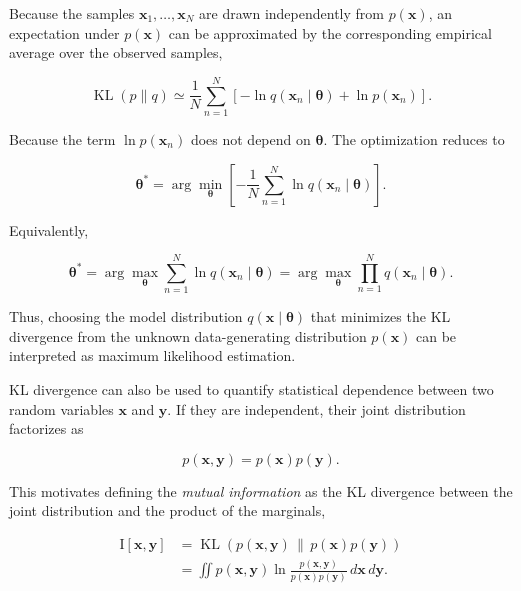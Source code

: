 \documentclass[10pt,twocolumn]{memoir}
\begin{document}
Because the samples $\mathbf{x}_1,\ldots,\mathbf{x}_N$ are drawn independently from $p(\mathbf{x})$, an expectation under $p(\mathbf{x})$ can be approximated by the corresponding empirical average over the observed samples,

\begin{equation}
    \operatorname{KL}(p\|q) \simeq \frac{1}{N}\sum_{n=1}^{N}\left[-\ln q(\mathbf{x}_n\mid\boldsymbol{\theta}) + \ln p(\mathbf{x}_n)\right].
\end{equation}

Because the term $\ln p(\mathbf{x}_n)$ does not depend on $\boldsymbol{\theta}$. The optimization reduces to

\begin{equation}
    \boldsymbol{\theta}^{*} = \arg\min_{\boldsymbol{\theta}}\left[-\frac{1}{N}\sum_{n=1}^{N}\ln q(\mathbf{x}_n\mid\boldsymbol{\theta})\right].
\end{equation}

Equivalently,

\begin{equation}
    \boldsymbol{\theta}^{*} = \arg\max_{\boldsymbol{\theta}}\sum_{n=1}^{N}\ln q(\mathbf{x}_n\mid\boldsymbol{\theta}) = \arg\max_{\boldsymbol{\theta}}\prod_{n=1}^{N}q(\mathbf{x}_n\mid\boldsymbol{\theta}).
\end{equation}

Thus, choosing the model distribution $q(\mathbf{x}\mid\boldsymbol{\theta})$ that minimizes the KL divergence from the unknown data-generating distribution $p(\mathbf{x})$ can be interpreted as maximum likelihood estimation.

KL divergence can also be used to quantify statistical dependence between two random variables $\mathbf{x}$ and $\mathbf{y}$. If they are independent, their joint distribution factorizes as

\begin{equation}
    p(\mathbf{x},\mathbf{y}) = p(\mathbf{x})p(\mathbf{y}).
\end{equation}

This motivates defining the \textit{mutual information} as the KL divergence between the joint distribution and the product of the marginals,

\begin{equation}
\begin{aligned}
    \mathrm{I}[\mathbf{x},\mathbf{y}]
    &=\operatorname{KL}\left(p(\mathbf{x},\mathbf{y})\,\|\,p(\mathbf{x})p(\mathbf{y})\right) \\
    &=\iint p(\mathbf{x},\mathbf{y})\ln\frac{p(\mathbf{x},\mathbf{y})}{p(\mathbf{x})p(\mathbf{y})}\,d\mathbf{x}\,d\mathbf{y}.
\end{aligned}
\end{equation}
\end{document}
